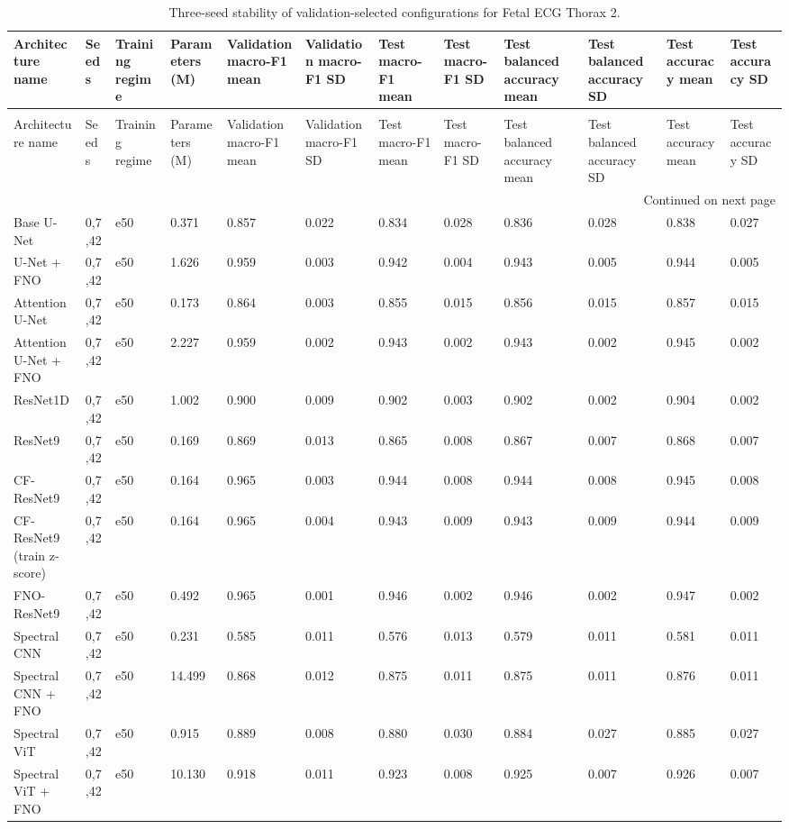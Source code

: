 \begin{longtable}{llllllllllll}
\caption{Three-seed stability of validation-selected configurations for Fetal ECG Thorax 2.} \label{tab:noninvasivefetalecgthorax2_seed_stability} \\
\toprule
Architecture name & Seeds & Training regime & Parameters (M) & Validation macro-F1 mean & Validation macro-F1 SD & Test macro-F1 mean & Test macro-F1 SD & Test balanced accuracy mean & Test balanced accuracy SD & Test accuracy mean & Test accuracy SD \\
\midrule
\endfirsthead
\caption[]{Three-seed stability of validation-selected configurations for Fetal ECG Thorax 2.} \\
\toprule
Architecture name & Seeds & Training regime & Parameters (M) & Validation macro-F1 mean & Validation macro-F1 SD & Test macro-F1 mean & Test macro-F1 SD & Test balanced accuracy mean & Test balanced accuracy SD & Test accuracy mean & Test accuracy SD \\
\midrule
\endhead
\midrule
\multicolumn{12}{r}{Continued on next page} \\
\midrule
\endfoot
\bottomrule
\endlastfoot
Base U-Net & 0,7,42 & e50 & 0.371 & 0.857 & 0.022 & 0.834 & 0.028 & 0.836 & 0.028 & 0.838 & 0.027 \\
U-Net + FNO & 0,7,42 & e50 & 1.626 & 0.959 & 0.003 & 0.942 & 0.004 & 0.943 & 0.005 & 0.944 & 0.005 \\
Attention U-Net & 0,7,42 & e50 & 0.173 & 0.864 & 0.003 & 0.855 & 0.015 & 0.856 & 0.015 & 0.857 & 0.015 \\
Attention U-Net + FNO & 0,7,42 & e50 & 2.227 & 0.959 & 0.002 & 0.943 & 0.002 & 0.943 & 0.002 & 0.945 & 0.002 \\
ResNet1D & 0,7,42 & e50 & 1.002 & 0.900 & 0.009 & 0.902 & 0.003 & 0.902 & 0.002 & 0.904 & 0.002 \\
ResNet9 & 0,7,42 & e50 & 0.169 & 0.869 & 0.013 & 0.865 & 0.008 & 0.867 & 0.007 & 0.868 & 0.007 \\
CF-ResNet9 & 0,7,42 & e50 & 0.164 & 0.965 & 0.003 & 0.944 & 0.008 & 0.944 & 0.008 & 0.945 & 0.008 \\
CF-ResNet9 (train z-score) & 0,7,42 & e50 & 0.164 & 0.965 & 0.004 & 0.943 & 0.009 & 0.943 & 0.009 & 0.944 & 0.009 \\
FNO-ResNet9 & 0,7,42 & e50 & 0.492 & 0.965 & 0.001 & 0.946 & 0.002 & 0.946 & 0.002 & 0.947 & 0.002 \\
Spectral CNN & 0,7,42 & e50 & 0.231 & 0.585 & 0.011 & 0.576 & 0.013 & 0.579 & 0.011 & 0.581 & 0.011 \\
Spectral CNN + FNO & 0,7,42 & e50 & 14.499 & 0.868 & 0.012 & 0.875 & 0.011 & 0.875 & 0.011 & 0.876 & 0.011 \\
Spectral ViT & 0,7,42 & e50 & 0.915 & 0.889 & 0.008 & 0.880 & 0.030 & 0.884 & 0.027 & 0.885 & 0.027 \\
Spectral ViT + FNO & 0,7,42 & e50 & 10.130 & 0.918 & 0.011 & 0.923 & 0.008 & 0.925 & 0.007 & 0.926 & 0.007 \\
\end{longtable}
